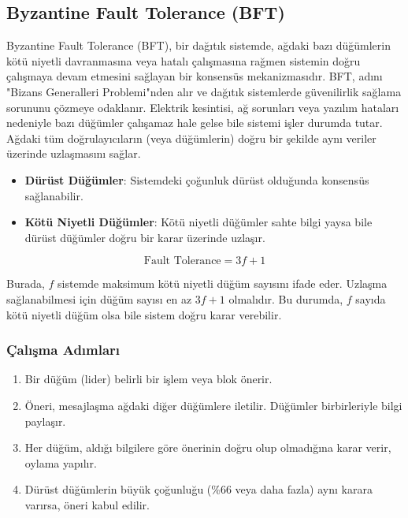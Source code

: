 \newpage

\subsection{Byzantine Fault Tolerance (BFT)}

Byzantine Fault Tolerance (BFT), bir dağıtık sistemde, ağdaki bazı düğümlerin kötü niyetli davranmasına veya hatalı çalışmasına rağmen sistemin doğru çalışmaya devam etmesini sağlayan bir konsensüs mekanizmasıdır. BFT, adını "Bizans Generalleri Problemi"nden alır ve dağıtık sistemlerde güvenilirlik sağlama sorununu çözmeye odaklanır. Elektrik kesintisi, ağ sorunları veya yazılım hataları nedeniyle bazı düğümler çalışamaz hale gelse bile sistemi işler durumda tutar. Ağdaki tüm doğrulayıcıların (veya düğümlerin) doğru bir şekilde aynı veriler üzerinde uzlaşmasını sağlar.

\begin{itemize}
    \item \textbf{Dürüst Düğümler}: Sistemdeki çoğunluk dürüst olduğunda konsensüs sağlanabilir.
    \item \textbf{Kötü Niyetli Düğümler}: Kötü niyetli düğümler sahte bilgi yaysa bile dürüst düğümler doğru bir karar üzerinde uzlaşır.
\end{itemize}

\[ \text{Fault Tolerance} = 3f + 1 \]

Burada, $f$ sistemde maksimum kötü niyetli düğüm sayısını ifade eder. Uzlaşma sağlanabilmesi için düğüm sayısı en az $3f + 1$ olmalıdır. Bu durumda, $f$ sayıda kötü niyetli düğüm olsa bile sistem doğru karar verebilir.

\subsubsection{Çalışma Adımları}

\begin{enumerate}
    \item Bir düğüm (lider) belirli bir işlem veya blok önerir.
    \item Öneri, mesajlaşma ağdaki diğer düğümlere iletilir. Düğümler birbirleriyle bilgi paylaşır.
    \item Her düğüm, aldığı bilgilere göre önerinin doğru olup olmadığına karar verir, oylama yapılır.
    \item Dürüst düğümlerin büyük çoğunluğu (\%66 veya daha fazla) aynı karara varırsa, öneri kabul edilir.
\end{enumerate}

